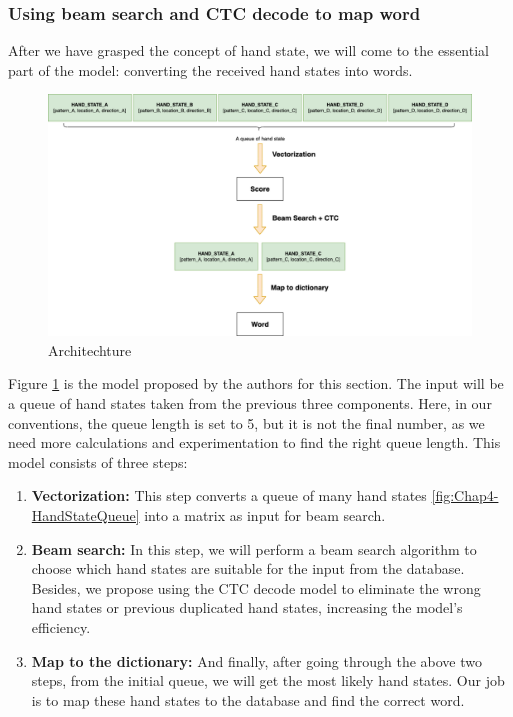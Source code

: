 \subsubsection{ Using beam search and CTC decode to map word}

After we have grasped the concept of hand state, we will come to the essential part of the model: converting the received hand states into words.
      
\begin{figure}[H]
  \centering
  \includegraphics[width=\textwidth]{img/Chap4/Architechture.png}
  \caption{Architechture}
  \label{fig:Chap4-Architechture}
\end{figure}

Figure \ref{fig:Chap4-Architechture} is the model proposed by the authors for this section. The input will be a queue of hand states taken from the previous three components. Here, in our conventions, the queue length is set to 5, but it is not the final number, as we need more calculations and experimentation to find the right queue length. This model consists of three steps:

\begin{enumerate}
  \item \textbf{Vectorization:} This step converts a queue of many hand states \ref{fig:Chap4-HandStateQueue} into a matrix as input for beam search.
  \item \textbf{Beam search:} In this step, we will perform a beam search algorithm to choose which hand states are suitable for the input from the database. Besides, we propose using the CTC decode model to eliminate the wrong hand states or previous duplicated hand states, increasing the model's efficiency.
  \item \textbf{Map to the dictionary:} And finally, after going through the above two steps, from the initial queue, we will get the most likely hand states. Our job is to map these hand states to the database and find the correct word.
\end{enumerate}
      
